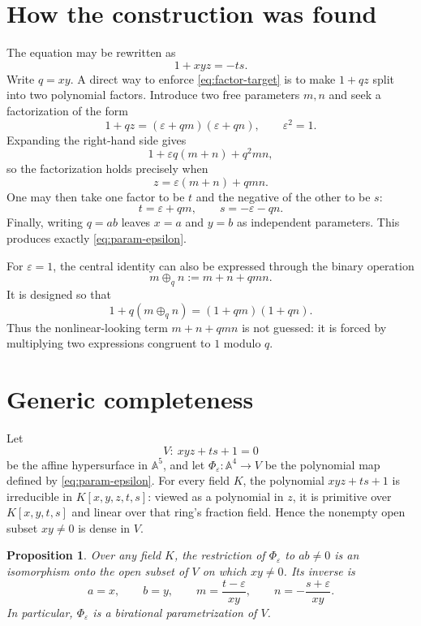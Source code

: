 \documentclass[11pt]{article}
\newtheorem{proposition}[theorem]{Proposition}
\theoremstyle{remark}
\newcommand{\A}{\mathbb A}
\begin{document}
\section{How the construction was found}

The equation may be rewritten as
\begin{equation}\label{eq:factor-target}
1+xyz=-ts.
\end{equation}
Write \(q=xy\).  A direct way to enforce \eqref{eq:factor-target} is to make
\(1+qz\) split into two polynomial factors.  Introduce two free parameters
\(m,n\) and seek a factorization of the form
\[
1+qz=(\varepsilon+qm)(\varepsilon+qn),
\qquad \varepsilon^2=1.
\]
Expanding the right-hand side gives
\[
1+\varepsilon q(m+n)+q^2mn,
\]
so the factorization holds precisely when
\[
z=\varepsilon(m+n)+qmn.
\]
One may then take one factor to be \(t\) and the negative of the other to be
\(s\):
\[
t=\varepsilon+qm,
\qquad
s=-\varepsilon-qn.
\]
Finally, writing \(q=ab\) leaves \(x=a\) and \(y=b\) as independent
parameters.  This produces exactly \eqref{eq:param-epsilon}.

For \(\varepsilon=1\), the central identity can also be expressed through the
binary operation
\[
m\mathbin{\oplus_q}n:=m+n+qmn.
\]
It is designed so that
\[
1+q(m\mathbin{\oplus_q}n)=(1+qm)(1+qn).
\]
Thus the nonlinear-looking term \(m+n+qmn\) is not guessed: it is forced by
multiplying two expressions congruent to \(1\) modulo \(q\).

\section{Generic completeness}

Let
\[
V:\ xyz+ts+1=0
\]
be the affine hypersurface in \(\A^5\), and let \(\Phi_\varepsilon:\A^4\to V\)
be the polynomial map defined by \eqref{eq:param-epsilon}.  For every field
\(K\), the polynomial \(xyz+ts+1\) is irreducible in
\(K[x,y,z,t,s]\): viewed as a polynomial in \(z\), it is primitive over
\(K[x,y,t,s]\) and linear over that ring's fraction field.  Hence the
nonempty open subset \(xy\neq0\) is dense in \(V\).

\begin{proposition}\label{prop:birational}
Over any field \(K\), the restriction of \(\Phi_\varepsilon\) to \(ab\neq0\)
is an isomorphism onto the open subset of \(V\) on which \(xy\neq0\).  Its
inverse is
\begin{equation}\label{eq:inverse}
 a=x,
 \qquad b=y,
 \qquad m=\frac{t-\varepsilon}{xy},
 \qquad n=-\frac{s+\varepsilon}{xy}.
\end{equation}
In particular, \(\Phi_\varepsilon\) is a birational parametrization of \(V\).
\end{proposition}
\end{document}
